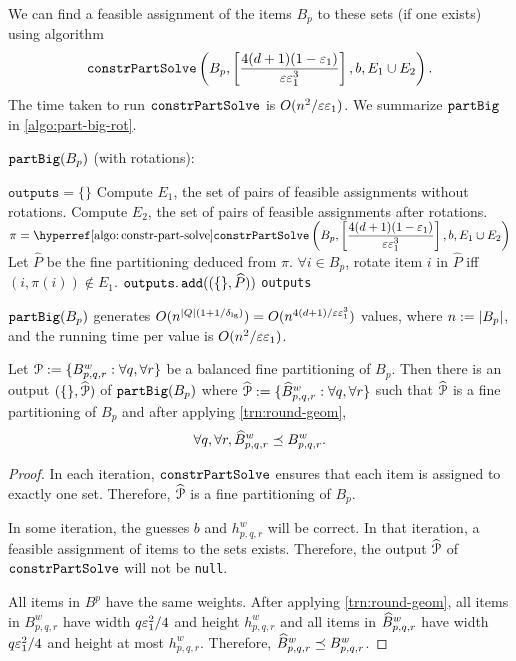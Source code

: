 We can find a feasible assignment of the items $B_p$ to these sets (if one exists) using algorithm
\[ \operatorname{\mathtt{constrPartSolve}}\left(B_p, \left[ \frac{4(d+1)(1-\varepsilon_1)}{\varepsilon\varepsilon_1^3} \right],
    b, E_1 \cup E_2\right). \]
The time taken to run $\operatorname{\mathtt{constrPartSolve}}$ is $O(n^2/\varepsilon\varepsilon_1)$.
We summarize $\operatorname{\mathtt{partBig}}$ in \cref{algo:part-big-rot}.

\begin{algorithm}[htb]
\caption{$\operatorname{\mathtt{partBig}}(B_p)$ (with rotations):}
\label{algo:part-big-rot}
\begin{algorithmic}[1]
\State $\texttt{outputs} = \{\}$
        \State Compute $E_1$, the set of pairs of feasible assignments without rotations.
        \State Compute $E_2$, the set of pairs of feasible assignments after rotations.
        \State $\pi = {\displaystyle \constrPartSolveHyp\left(B_p,
            \left[ \frac{4(d+1)(1-\epsLarge)}{\eps\epsLarge^3} \right], b, E_1 \cup E_2\right) }$
            \State Let $\widehat{P}$ be the fine partitioning deduced from $\pi$.
            \State $\forall i \in B_p$, rotate item $i$ in $\widehat{P}$
                iff $(i, \pi(i)) \not\in E_1$.
            \State $\operatorname{\mathtt{outputs.add}}((\{\}, \widehat{P}))$
        \EndIf
    \EndFor
\EndFor
\State \Return \texttt{outputs}
\end{algorithmic}
\end{algorithm}

\begin{claim}
\label{claim:part-big-rot-time}
$\operatorname{\mathtt{partBig}}(B_p)$ generates $O(n^{|Q|(1+1/\delta_{\mathrm{lg}})}) = O(n^{4(d+1)/\varepsilon\varepsilon_1^3})$
values, where $n := |B_p|$, and the running time per value is $O(n^2/\varepsilon\varepsilon_1)$.
\end{claim}

\begin{lemma}
\label{lem:part-big-rot}
Let $\mathcal{P} := \{B^w_{p,q,r}: \forall q, \forall r\}$
be a balanced fine partitioning of $B_p$.
Then there is an output $(\{\}, \widehat{\mathcal{P}})$ of $\operatorname{\mathtt{partBig}}(B_p)$ where
$\widehat{\mathcal{P}} := \{\widehat{B}^w_{p,q,r}: \forall q, \forall r\}$
such that $\widehat{\mathcal{P}}$ is a fine partitioning of $B_p$ and
after applying \cref{trn:round-geom},
\[ \forall q, \forall r, \widehat{B}^w_{p,q,r} \preceq B^w_{p,q,r}. \]
\end{lemma}
\begin{proof}
In each iteration, $\operatorname{\mathtt{constrPartSolve}}$ ensures that each item is assigned to exactly one set.
Therefore, $\widehat{\mathcal{P}}$ is a fine partitioning of $B_p$.

In some iteration, the guesses $b$ and $h^w_{p,q,r}$ will be correct.
In that iteration, a feasible assignment of items to the sets exists.
Therefore, the output $\widehat{\mathcal{P}}$ of $\operatorname{\mathtt{constrPartSolve}}$ will not be \texttt{null}.

All items in $B^p$ have the same weights. After applying \cref{trn:round-geom},
all items in $B^w_{p,q,r}$ have width $q\varepsilon_1^2/4$ and height $h^w_{p,q,r}$
and all items in $\widehat{B}^w_{p,q,r}$ have width $q\varepsilon_1^2/4$ and
height at most $h^w_{p,q,r}$.
Therefore, $\widehat{B}^w_{p,q,r} \preceq B^w_{p,q,r}$.
\end{proof}

